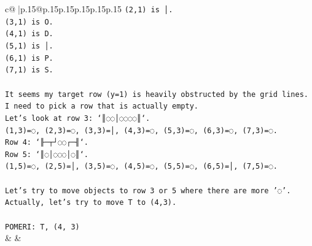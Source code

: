\documentclass{article}
\begin{document}
{\begin{supertabular}{c@{$\;$}|p{.15\linewidth}@{}p{.15\linewidth}p{.15\linewidth}p{.15\linewidth}p{.15\linewidth}p{.15\linewidth}}
{{{\texttt{(2,1) is │.} \\
\texttt{(3,1) is O.} \\
\texttt{(4,1) is D.} \\
\texttt{(5,1) is │.} \\
\texttt{(6,1) is P.} \\
\texttt{(7,1) is S.} \\
\\ 
\texttt{It seems my target row (y=1) is heavily obstructed by the grid lines. I need to pick a row that is actually empty.} \\
\texttt{Let's look at row 3: `║◌◌│◌◌◌◌║`.} \\
\texttt{(1,3)=◌, (2,3)=◌, (3,3)=│, (4,3)=◌, (5,3)=◌, (6,3)=◌, (7,3)=◌.} \\
\texttt{Row 4: `╟─┬┘◌◌┌─╢`.} \\
\texttt{Row 5: `║◌│◌◌◌│◌║`.} \\
\texttt{(1,5)=◌, (2,5)=│, (3,5)=◌, (4,5)=◌, (5,5)=◌, (6,5)=│, (7,5)=◌.} \\
\\ 
\texttt{Let's try to move objects to row 3 or 5 where there are more '◌'.} \\
\texttt{Actually, let's try to move T to (4,3).} \\
\\ 
\texttt{POMERI: T, (4, 3)} \\
            }
        }
    }
    & & \\ \\


\end{supertabular}}
\end{document}

